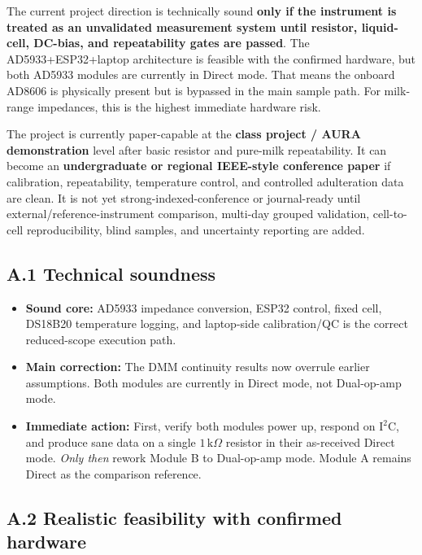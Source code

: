 \documentclass[11pt,a4paper]{article}
\newcommand{\kohm}[1]{\ensuremath{#1\,\mathrm{k}\Omega}}
\begin{document}
\begin{verdictbox}
The current project direction is technically sound \textbf{only if the instrument is treated as an unvalidated measurement system until resistor, liquid-cell, DC-bias, and repeatability gates are passed}. The AD5933+ESP32+laptop architecture is feasible with the confirmed hardware, but both AD5933 modules are currently in Direct mode. That means the onboard AD8606 is physically present but is bypassed in the main sample path. For milk-range impedances, this is the highest immediate hardware risk.

The project is currently paper-capable at the \textbf{class project / AURA demonstration} level after basic resistor and pure-milk repeatability. It can become an \textbf{undergraduate or regional IEEE-style conference paper} if calibration, repeatability, temperature control, and controlled adulteration data are clean. It is not yet strong-indexed-conference or journal-ready until external/reference-instrument comparison, multi-day grouped validation, cell-to-cell reproducibility, blind samples, and uncertainty reporting are added.
\end{verdictbox}

\subsection{A.1 Technical soundness}

\begin{itemize}
\item \textbf{Sound core:} AD5933 impedance conversion, ESP32 control, fixed cell, DS18B20 temperature logging, and laptop-side calibration/QC is the correct reduced-scope execution path.
\item \textbf{Main correction:} The DMM continuity results now overrule earlier assumptions. Both modules are currently in Direct mode, not Dual-op-amp mode.
\item \textbf{Immediate action:} First, verify both modules power up, respond on $\mathrm{I^2C}$, and produce sane data on a single $\kohm{1}$ resistor in their as-received Direct mode. \emph{Only then} rework Module B to Dual-op-amp mode. Module A remains Direct as the comparison reference.
\end{itemize}

\subsection{A.2 Realistic feasibility with confirmed hardware}
\end{document}
